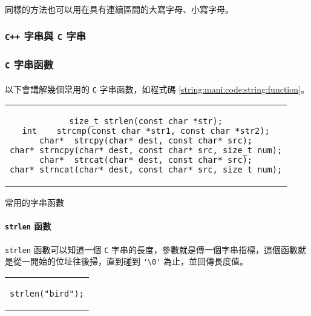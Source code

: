 \documentclass[12pt,a4paper,oneside]{article}
\begin{document}
\begin{CJK}{UTF8}{bkai}
\paragraph{}同樣的方法也可以用在具有連續區間的大寫字母、小寫字母。

\subsubsection{\texttt{C++} 字串與 \texttt{C} 字串}


\subsubsection{\texttt{C} 字串函數}

\paragraph{}以下會講解幾個常用的 \texttt{C} 字串函數，如程式碼 \ref{string:mani:code:string:function}。

\begin{code}[h!]
  \centering
  \begin{tabular}{c}
  \begin{lstlisting}
size_t strlen(const char *str);
int    strcmp(const char *str1, const char *str2);
char*  strcpy(char* dest, const char* src);
char* strncpy(char* dest, const char* src, size_t num);
char*  strcat(char* dest, const char* src);
char* strncat(char* dest, const char* src, size_t num);
  \end{lstlisting}
  \end{tabular}
  \caption{常用的字串函數}
  \label{string:mani:code:string:function}
\end{code}

\paragraph{\lstinline!strlen! 函數}\lstinline!strlen! 函數可以知道一個 \texttt{C} 字串的長度，參數就是傳一個字串指標，這個函數就是從一開始的位址往後掃，直到碰到 \lstinline!'\0'! 為止，並回傳長度值。

\begin{code}[h!]
  \centering
  \begin{tabular}{c}
  \begin{lstlisting}
strlen("bird");
  \end{lstlisting}
  \end{tabular}
  \caption{\lstinline!strlen! 範例}
  \label{string:mani:code:strlen:example}
\end{code}


\end{CJK}
\end{document}
